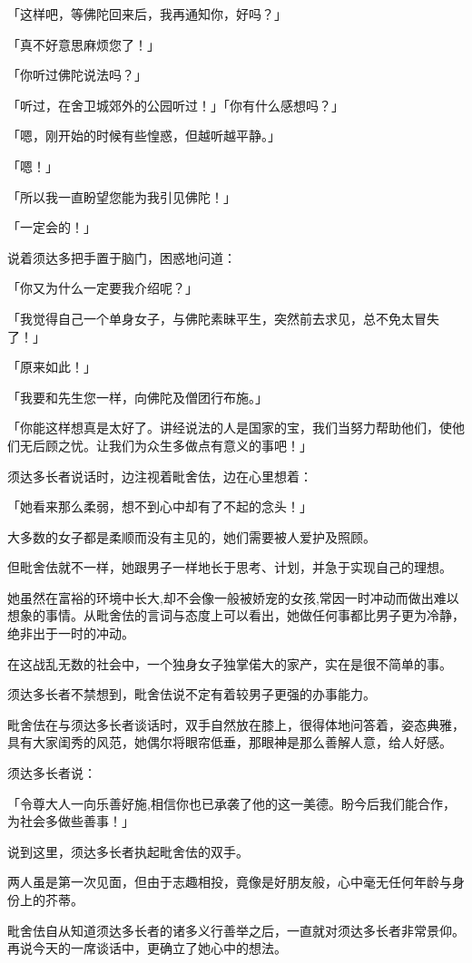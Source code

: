 \documentclass[twoside,openany]{book}
\begin{document}
「这样吧，等佛陀回来后，我再通知你，好吗？」

「真不好意思麻烦您了！」

「你听过佛陀说法吗？」

「听过，在舍卫城郊外的公园听过！」「你有什么感想吗？」

「嗯，刚开始的时候有些惶惑，但越听越平静。」

「嗯！」

「所以我一直盼望您能为我引见佛陀！」

「一定会的！」

说着须达多把手置于脑门，困惑地问道：

「你又为什么一定要我介绍呢？」

「我觉得自己一个单身女子，与佛陀素昧平生，突然前去求见，总不免太冒失了！」

「原来如此！」

「我要和先生您一样，向佛陀及僧团行布施。」

「你能这样想真是太好了。讲经说法的人是国家的宝，我们当努力帮助他们，使他们无后顾之忧。让我们为众生多做点有意义的事吧！」

须达多长者说话时，边注视着毗舍佉，边在心里想着：

「她看来那么柔弱，想不到心中却有了不起的念头！」

大多数的女子都是柔顺而没有主见的，她们需要被人爱护及照顾。

但毗舍佉就不一样，她跟男子一样地长于思考、计划，并急于实现自己的理想。

她虽然在富裕的环境中长大,却不会像一般被娇宠的女孩,常因一时冲动而做出难以想象的事情。从毗舍佉的言词与态度上可以看出，她做任何事都比男子更为冷静，绝非出于一时的冲动。

在这战乱无数的社会中，一个独身女子独掌偌大的家产，实在是很不简单的事。

须达多长者不禁想到，毗舍佉说不定有着较男子更强的办事能力。

毗舍佉在与须达多长者谈话时，双手自然放在膝上，很得体地问答着，姿态典雅，具有大家闺秀的风范，她偶尔将眼帘低垂，那眼神是那么善解人意，给人好感。

须达多长者说：

「令尊大人一向乐善好施,相信你也已承袭了他的这一美德。盼今后我们能合作，为社会多做些善事！」

说到这里，须达多长者执起毗舍佉的双手。

两人虽是第一次见面，但由于志趣相投，竟像是好朋友般，心中毫无任何年龄与身份上的芥蒂。

毗舍佉自从知道须达多长者的诸多义行善举之后，一直就对须达多长者非常景仰。再说今天的一席谈话中，更确立了她心中的想法。
\end{document}
